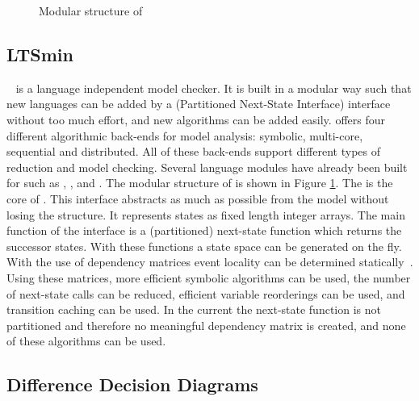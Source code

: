 \begin{figure}[t] 

\caption{Modular structure of \ltsmin{}}
\label{fig:pins_modern}
\end{figure}

\subsection{LTSmin}
\ltsmin{}~\cite{eemcs18152,ltsmin-mc:nmf2011} is a language independent model checker. It is built in a modular way such that new languages can be added by a \pins{} (Partitioned Next-State Interface) interface without too much effort, and new algorithms can be added easily. \ltsmin{} offers four different algorithmic back-ends for model analysis: symbolic, multi-core, sequential and distributed. All of these back-ends support different types of reduction and model checking. Several language modules have already been built for \ltsmin{} such as \mcrl{}, \promela{}, \dve{} and \uppaal{}. The modular structure of \ltsmin{} is shown in Figure \ref{fig:pins_modern}. The \pins{} is the core of \ltsmin{}. This interface abstracts as much as possible from the model without losing the structure. It represents states as fixed length integer arrays. The main function of the interface is a (partitioned) next-state function which returns the successor states. With these functions a state space can be generated on the fly. With the use of dependency matrices event locality can be determined statically~\cite{rwcmatrices}. Using these matrices, more efficient symbolic algorithms can be used, the number of next-state calls can be reduced, efficient variable reorderings can be used, and transition caching can be used. In the current \uppaal{} \pins{} the next-state function is not partitioned and therefore no meaningful dependency matrix is created, and none of these algorithms can be used.

\subsection{Difference Decision Diagrams}

